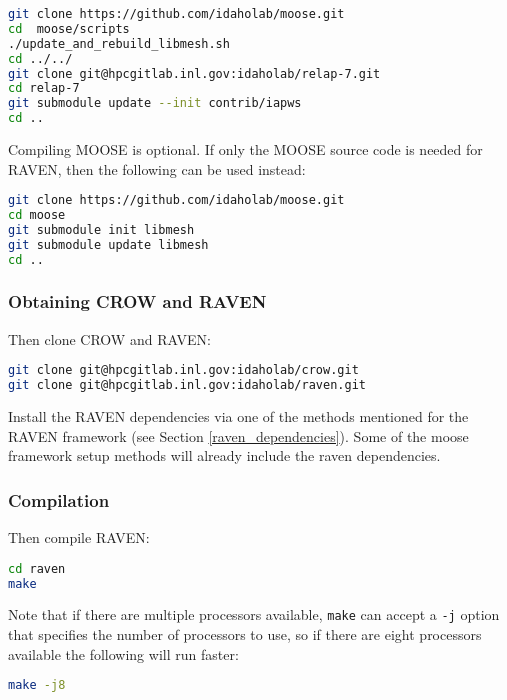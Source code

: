 \begin{lstlisting}[language=bash]
git clone https://github.com/idaholab/moose.git
cd  moose/scripts
./update_and_rebuild_libmesh.sh
cd ../../
git clone git@hpcgitlab.inl.gov:idaholab/relap-7.git
cd relap-7
git submodule update --init contrib/iapws
cd ..
\end{lstlisting}

Compiling MOOSE is optional.  If only the MOOSE source code is needed for
RAVEN, then the following can be used instead:

\begin{lstlisting}[language=bash]
git clone https://github.com/idaholab/moose.git
cd moose
git submodule init libmesh
git submodule update libmesh
cd ..
\end{lstlisting}

\subsubsection{Obtaining CROW and RAVEN}
Then clone CROW and RAVEN:

\begin{lstlisting}[language=bash]
git clone git@hpcgitlab.inl.gov:idaholab/crow.git
git clone git@hpcgitlab.inl.gov:idaholab/raven.git
\end{lstlisting}

Install the RAVEN dependencies via one of the methods mentioned for
the RAVEN framework (see Section \ref{raven_dependencies}).  Some of
the moose framework setup methods will already include the raven
dependencies.

\subsubsection{Compilation}

Then compile RAVEN:

\begin{lstlisting}[language=bash]
cd raven
make
\end{lstlisting}

Note that if there are multiple processors available, \texttt{make} can accept a \texttt{-j} option that specifies the number of processors to use, so if there are eight processors available the following will run faster:

\begin{lstlisting}[language=bash]
make -j8
\end{lstlisting}


